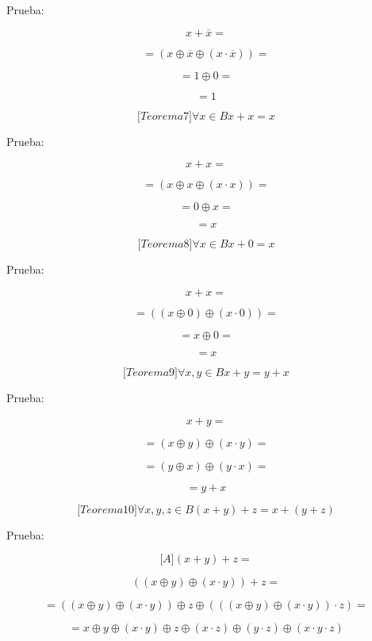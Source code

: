 \begin{enumerate}
\begin{enumerate}
\begin{enumerate}
      Prueba:

      \[{x + \overline{x}} =\]

      \[{= \left( {x \oplus \overline{x} \oplus \left( {x \cdot \overline{x}} \right)} \right)} =\]

      \[{= {1 \oplus 0}} =\]

      \[= 1\]

      \[{\lbrack{{Teorema}7}\rbrack}\forall{x \in B}{{x + x} = x}\]

      Prueba:

      \[{x + x} =\]

      \[{= \left( {x \oplus x \oplus \left( {x \cdot x} \right)} \right)} =\]

      \[{= {0 \oplus x}} =\]

      \[= x\]

      \[{\lbrack{{Teorema}8}\rbrack}\forall{x \in B}{{x + 0} = x}\]

      Prueba:

      \[{x + x} =\]

      \[{= \left( {\left( {x \oplus 0} \right) \oplus \left( {x \cdot 0} \right)} \right)} =\]

      \[{= {x \oplus 0}} =\]

      \[= x\]

      \[{\lbrack{{Teorema}9}\rbrack}\forall x,{y \in B}{{x + y} = {y + x}}\]

      Prueba:

      \[{x + y} =\]

      \[{= \left( {x \oplus y} \right)} \oplus {\left( {x \cdot y} \right) =}\]

      \[{= \left( {y \oplus x} \right)} \oplus {\left( {y \cdot x} \right) =}\]

      \[= {y + x}\]

      \[{\lbrack{{Teorema}10}\rbrack}\forall x,y,{z \in B}{{\left( {x + y} \right) + z} = {x + \left( {y + z} \right)}}\]

      Prueba:

      \[{\lbrack A\rbrack}{{{({x + y})} + z} =}\]

      \[{{({{({x \oplus y})} \oplus {({x \cdot y})}})} + z} =\]

      \[{= {({{({x \oplus y})} \oplus {({x \cdot y})}})}} \oplus z \oplus {{({{({{({x \oplus y})} \oplus {({x \cdot y})}})} \cdot z})} =}\]

      \[{= x} \oplus y \oplus {({x \cdot y})} \oplus z \oplus {({x \cdot z})} \oplus {({y \cdot z})} \oplus {({{x \cdot y} \cdot z})}\]


\end{enumerate}
\end{enumerate}
\end{enumerate}

